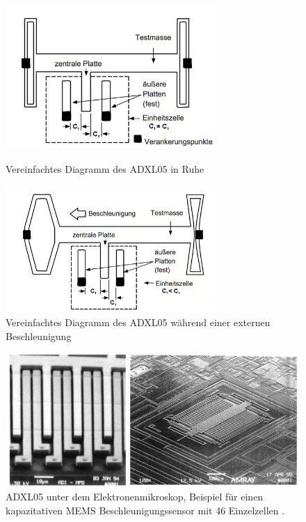\documentclass[12pt,a4paper]{scrartcl}
\begin{document}
\begin{figure}[htb]
\begin{minipage}[H]{8cm}
	\centering
	\includegraphics[width=8cm]{adxl_ruhe.png}
	\caption{Vereinfachtes Diagramm des ADXL05 in Ruhe \citep{Devices:1996pd}}
	\label{adxl_ruhe}
\end{minipage}
\hfill
\begin{minipage}[H]{8cm}
	\centering
	\includegraphics[width=8cm]{adxl_action.png}
	\caption{Vereinfachtes Diagramm des ADXL05 während einer externen Beschleunigung \citep{Devices:1996pd}}
	\label{adxl_action}
\end{minipage}
\end{figure}

\begin{figure}[htb]
\centering
\includegraphics[scale=1]{adxl_micro.png}
\caption{ADXL05 unter dem Elektronenmikroskop, Beispiel für einen kapazitativen MEMS Beschleunigungssensor mit 46 Einzelzellen \citep{Klingbeil:2006qy}.}
\label{adxl_micro}
\end{figure}
\end{document}
